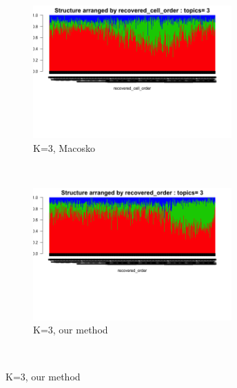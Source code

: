 \documentclass[11pt]{article}
\begin{document}
 \begin{figure}[ht]
    \centering    
     \begin{subfigure}[t]{0.5\textwidth}
        \centering
        \includegraphics[height=2in]{../figures/ipsc_structure_batchcorrect_cellcycle/clus_3/struct_clus_3_recovered_cell_order.png}
        \caption{K=3, Macosko}
    \end{subfigure}%
    ~
    \begin{subfigure}[t]{0.5\textwidth}
        \centering
        \includegraphics[height=2in]{../figures/ipsc_structure_batchcorrect_cellcycle/clus_3/struct_clus_3_recovered_order.png}
        \caption{K=3, our method}
    \end{subfigure}\\


\end{figure}
\end{document}
